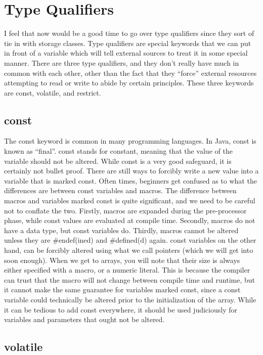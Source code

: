 \documentclass{article}
\begin{document}
\section{Type Qualifiers}

I feel that now would be a good time to go over type qualifiers since they sort of tie in with storage
classes. Type qualifiers are special keywords that we can put in front of a variable which will tell external
sources to treat it in some special manner. There are three type qualifiers, and they don’t really have much
in common with each other, other than the fact that they “force” external resources attempting to read or
write to abide by certain principles. These three keywords are const, volatile, and restrict.

\subsection{const}

The const keyword is common in many programming languages. In Java, const is known as “final”. const stands
for constant, meaning that the value of the variable should not be altered. While const is a very good
safeguard, it is certainly not bullet proof. There are still ways to forcibly write a new value into a
variable that is marked const. Often times, beginners get confused as to what the differences are between
const variables and macros. The difference between macros and variables marked const is quite significant,
and we need to be careful not to conflate the two. Firstly, macros are expanded during the pre-processor
phase, while const values are evaluated at compile time. Secondly, macros do not have a data type, but const
variables do. Thirdly, macros cannot be altered unless they are #endef(ined) and #defined(d) again. const
variables on the other hand, can be forcibly altered using what we call pointers (which we will get into soon
enough). When we get to arrays, you will note that their size is always either specified with a macro, or a
numeric literal. This is because the compiler can trust that the macro will not change between compile time
and runtime, but it cannot make the same guarantee for variables marked const, since a const variable could
technically be altered prior to the initialization of the array. While it can be tedious to add const
everywhere, it should be used judiciously for variables and parameters that ought not be altered.

\subsection{volatile}
\end{document}
